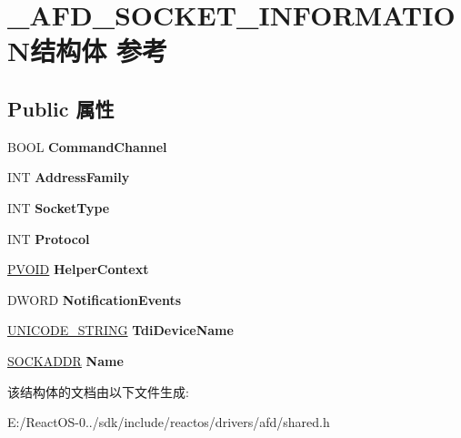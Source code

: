 \hypertarget{struct___a_f_d___s_o_c_k_e_t___i_n_f_o_r_m_a_t_i_o_n}{}\section{\+\_\+\+A\+F\+D\+\_\+\+S\+O\+C\+K\+E\+T\+\_\+\+I\+N\+F\+O\+R\+M\+A\+T\+I\+O\+N结构体 参考}
\label{struct___a_f_d___s_o_c_k_e_t___i_n_f_o_r_m_a_t_i_o_n}
\subsection*{Public 属性}
\begin{DoxyCompactItemize}
\item 
\mbox{\label{struct___a_f_d___s_o_c_k_e_t___i_n_f_o_r_m_a_t_i_o_n_adc690c8e56d52ffd1f9ac07112c006c0}} 
B\+O\+OL {\bfseries Command\+Channel}
\item 
\mbox{\label{struct___a_f_d___s_o_c_k_e_t___i_n_f_o_r_m_a_t_i_o_n_acf94cdfb99719a5a67f580683cb7af0a}} 
I\+NT {\bfseries Address\+Family}
\item 
\mbox{\label{struct___a_f_d___s_o_c_k_e_t___i_n_f_o_r_m_a_t_i_o_n_a57c516aec705422460a06a47e35408ee}} 
I\+NT {\bfseries Socket\+Type}
\item 
\mbox{\label{struct___a_f_d___s_o_c_k_e_t___i_n_f_o_r_m_a_t_i_o_n_a9fc953cd83e7ea561a56d3b63f6e5744}} 
I\+NT {\bfseries Protocol}
\item 
\mbox{\label{struct___a_f_d___s_o_c_k_e_t___i_n_f_o_r_m_a_t_i_o_n_a36ae5a79b3477c961b7c897462faa8ae}} 
\hyperlink{interfacevoid}{P\+V\+O\+ID} {\bfseries Helper\+Context}
\item 
\mbox{\label{struct___a_f_d___s_o_c_k_e_t___i_n_f_o_r_m_a_t_i_o_n_a3d1d2260d0f5c3cb833e3ded4496d3c5}} 
D\+W\+O\+RD {\bfseries Notification\+Events}
\item 
\mbox{\label{struct___a_f_d___s_o_c_k_e_t___i_n_f_o_r_m_a_t_i_o_n_a4fe99ce25b1d21480f28cca3622e7e84}} 
\hyperlink{struct___u_n_i_c_o_d_e___s_t_r_i_n_g}{U\+N\+I\+C\+O\+D\+E\+\_\+\+S\+T\+R\+I\+NG} {\bfseries Tdi\+Device\+Name}
\item 
\mbox{\label{struct___a_f_d___s_o_c_k_e_t___i_n_f_o_r_m_a_t_i_o_n_a587b871f71570b5369bdc9a777304b7c}} 
\hyperlink{structsockaddr}{S\+O\+C\+K\+A\+D\+DR} {\bfseries Name}
\end{DoxyCompactItemize}


该结构体的文档由以下文件生成\+:\begin{DoxyCompactItemize}
\item 
E\+:/\+React\+O\+S-\/0../sdk/include/reactos/drivers/afd/shared.\+h\end{DoxyCompactItemize}
